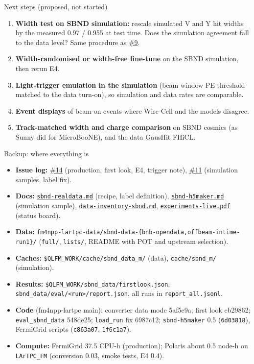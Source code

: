 \documentclass[aspectratio=169,10pt]{beamer}
\newcommand{\code}[1]{\texttt{#1}}
\newcommand{\gh}{https://github.com/HaiwangYu/fm4npp-lartpc}
\newcommand{\iss}[1]{\href{\gh/issues/#1}{\color{blue!60!black}\##1}}
\newcommand{\doc}[1]{\href{\gh/blob/main/multi-modal-qlmatch/docs/#1}{\color{blue!60!black}\texttt{#1}}}
\begin{document}
\begin{frame}{Next steps (proposed, not started)}
  \footnotesize
  \begin{enumerate}\setlength{\itemsep}{6pt}
    \item \textbf{Width test on SBND simulation:} rescale simulated V and Y hit widths by the measured 0.97 / 0.955 at test time. Does
      the simulation agreement fall to the data level? Same procedure as \iss{9}.
    \item \textbf{Width-randomised or width-free fine-tune} on the SBND simulation, then rerun E4.
    \item \textbf{Light-trigger emulation in the simulation} (beam-window PE threshold matched to the data turn-on), so simulation
      and data rates are comparable.
    \item \textbf{Event displays} of beam-on events where Wire-Cell and the models disagree.
    \item \textbf{Track-matched width and charge comparison} on SBND cosmics (as Sunny did for MicroBooNE), and the data GausHit
      FHiCL.
  \end{enumerate}
\end{frame}

\begin{frame}{Backup: where everything is}
  \scriptsize
  \begin{itemize}\setlength{\itemsep}{3pt}
    \item \textbf{Issue log:} \iss{14} (production, first look, E4, trigger note), \iss{11} (simulation samples, label fix).
    \item \textbf{Docs:} \doc{sbnd-realdata.md} (recipe, label definition), \doc{sbnd-h5maker.md} (simulation sample),
      \doc{data-inventory-sbnd.md}, \doc{experiments-live.pdf} (status board).
    \item \textbf{Data:} \code{fm4npp-lartpc-data/sbnd-data-\{bnb-opendata,offbeam-intime-run1\}/} (\code{full/}, \code{lists/}, README with POT and upstream selection).
    \item \textbf{Caches:} \code{\$QLFM\_WORK/cache/sbnd\_data\_m/} (data), \code{cache/sbnd\_m/} (simulation).
    \item \textbf{Results:} \code{\$QLFM\_WORK/sbnd\_data/firstlook.json}; \code{sbnd\_data/eval/<run>/report.json}, all runs in \code{report\_all.jsonl}.
    \item \textbf{Code} (fm4npp-lartpc main): converter data mode 5af5e9a; first look eb29862; \code{eval\_sbnd\_data} 548de25;
      \code{load\_run} fix 6987c12; \code{sbnd-h5maker} 0.5 (\code{6d03818}), FermiGrid scripts (\code{c863a07}, \code{1f6c1a7}).
    \item \textbf{Compute:} FermiGrid 37.5 CPU-h (production); Polaris about 0.5 node-h on \code{LArTPC\_FM} (conversion 0.03, smoke tests, E4 0.4).
  \end{itemize}
\end{frame}
\end{document}
